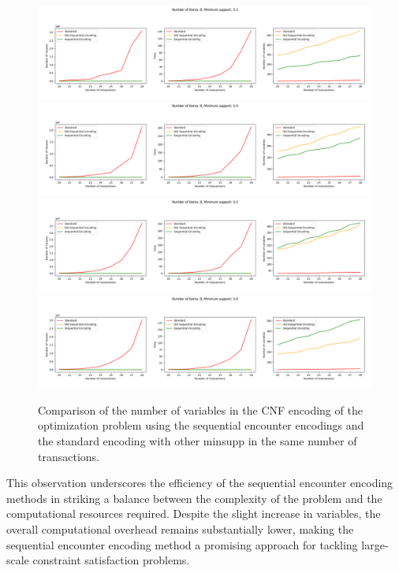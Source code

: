\begin{figure}[H]
    \centering
    \includegraphics[width=1\textwidth]{chapter4/image/min_supp_0.3.png}
    \includegraphics[width=1\textwidth]{chapter4/image/min_supp_0.4.png}
    \includegraphics[width=1\textwidth]{chapter4/image/min_supp_0.5.png}
    \includegraphics[width=1\textwidth]{chapter4/image/min_supp_0.6.png}
    \caption{Comparison of the number of variables in the CNF encoding of the optimization problem using the sequential encounter encodings and the standard encoding with other minsupp in the same number of transactions.}
    \label{fig:4_5}
\end{figure}

This observation underscores the efficiency of the sequential encounter encoding methods in striking a balance between the complexity of the problem and the computational resources required.
Despite the slight increase in variables, the overall computational overhead remains substantially lower,
making the sequential encounter encoding method a promising approach for tackling large-scale constraint satisfaction problems.


